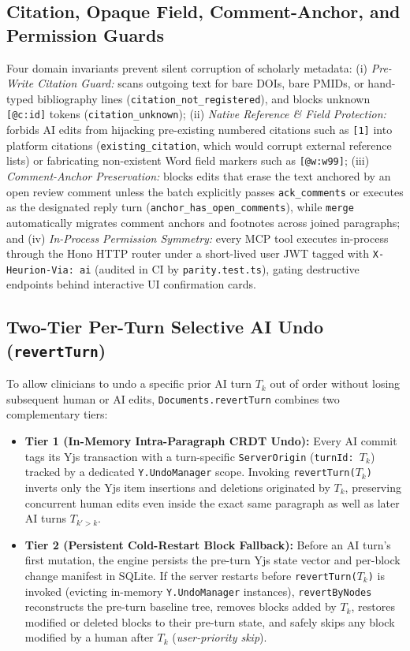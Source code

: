 \documentclass[11pt,a4paper]{article}
\begin{document}
\subsection{Citation, Opaque Field, Comment-Anchor, and Permission Guards}
Four domain invariants prevent silent corruption of scholarly metadata:
(i) \emph{Pre-Write Citation Guard:} scans outgoing text for bare DOIs, bare PMIDs, or hand-typed bibliography lines (\texttt{citation\_not\_registered}), and blocks unknown \texttt{[@c:id]} tokens (\texttt{citation\_unknown});
(ii) \emph{Native Reference \& Field Protection:} forbids AI edits from hijacking pre-existing numbered citations such as \texttt{[1]} into platform citations (\texttt{existing\_citation}, which would corrupt external reference lists) or fabricating non-existent Word field markers such as \texttt{[@w:w99]};
(iii) \emph{Comment-Anchor Preservation:} blocks edits that erase the text anchored by an open review comment unless the batch explicitly passes \texttt{ack\_comments} or executes as the designated reply turn (\texttt{anchor\_has\_open\_comments}), while \texttt{merge} automatically migrates comment anchors and footnotes across joined paragraphs; and
(iv) \emph{In-Process Permission Symmetry:} every MCP tool executes in-process through the Hono HTTP router under a short-lived user JWT tagged with \texttt{X-Heurion-Via: ai} (audited in CI by \texttt{parity.test.ts}), gating destructive endpoints behind interactive UI confirmation cards.

\subsection{Two-Tier Per-Turn Selective AI Undo (\texttt{revertTurn})}
To allow clinicians to undo a specific prior AI turn $T_k$ out of order without losing subsequent human or AI edits, \texttt{Documents.revertTurn} combines two complementary tiers:
\begin{itemize}[leftmargin=1.5em,itemsep=2pt]
  \item \textbf{Tier 1 (In-Memory Intra-Paragraph CRDT Undo):} Every AI commit tags its Yjs transaction with a turn-specific \texttt{ServerOrigin} (\texttt{turnId: $T_k$}) tracked by a dedicated \texttt{Y.UndoManager} scope. Invoking \texttt{revertTurn($T_k$)} inverts only the Yjs item insertions and deletions originated by $T_k$, preserving concurrent human edits even inside the exact same paragraph as well as later AI turns $T_{k' > k}$.
  \item \textbf{Tier 2 (Persistent Cold-Restart Block Fallback):} Before an AI turn's first mutation, the engine persists the pre-turn Yjs state vector and per-block change manifest in SQLite. If the server restarts before \texttt{revertTurn($T_k$)} is invoked (evicting in-memory \texttt{Y.UndoManager} instances), \texttt{revertByNodes} reconstructs the pre-turn baseline tree, removes blocks added by $T_k$, restores modified or deleted blocks to their pre-turn state, and safely skips any block modified by a human after $T_k$ (\emph{user-priority skip}).
\end{itemize}
\end{document}
